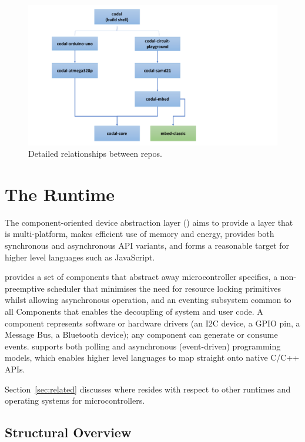 \begin{figure}[t]
    \includegraphics[width=4.5in]{codalFig.pdf}
    \caption{\label{fig:codal}Detailed relationships between \CO repos.}
\end{figure}

\section{The \CO Runtime}
\label{sec:codal}

The component-oriented device abstraction layer (\CO) aims to provide a layer that is multi-platform, makes efficient use of memory and energy, provides both synchronous and asynchronous API variants, and forms a reasonable target for higher level languages
such as JavaScript.

\CO provides a set of components that abstract away microcontroller specifics, a non-preemptive scheduler that minimises the need for resource locking primitives whilst allowing asynchronous operation, and an eventing subsystem common to all \CO Components that enables the decoupling of system and user code. A \CO component represents software or hardware drivers (an I2C device, a GPIO pin, a Message Bus, a Bluetooth device); any component can generate or consume events. \CO supports both polling and asynchronous (event-driven) programming models, which enables higher level languages to map straight onto native C/C++ APIs.

Section~\ref{sec:related} discusses where \CO resides with respect to other runtimes and operating systems for microcontrollers.


\subsection{Structural Overview}

